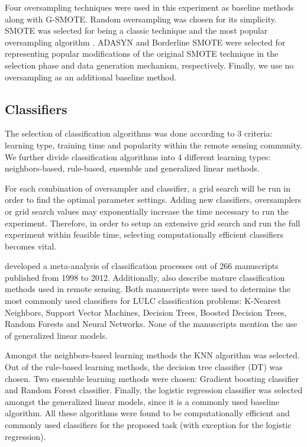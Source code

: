 \documentclass[remotesensing,article,submit,moreauthors,pdftex]{Definitions/mdpi}
\begin{document}
Four oversampling techniques were used in this experiment as baseline methods
along with G-SMOTE. Random oversampling was chosen for its simplicity. SMOTE was
selected for being a classic technique and the most popular oversampling
algorithm \cite{Douzas2019}. ADASYN \cite{HaiboHe2008} and Borderline SMOTE
\cite{Han2005} were selected for representing popular modifications of the
original SMOTE technique in the selection phase and data generation mechanism,
respectively. Finally, we use no oversampling as an additional baseline method.

\subsection{Classifiers}

The selection of classification algorithms was done according to 3 criteria:
learning type, training time and popularity within the remote sensing community.
We further divide classification algorithms into 4 different learning types:
neighbors-based, rule-based, ensemble and generalized linear methods.

For each combination of oversampler and classifier, a grid search will be run in
order to find the optimal parameter settings. Adding new classifiers,
oversamplers or grid search values may exponentially increase the time necessary
to run the experiment. Therefore, in order to setup an extensive grid search and
run the full experiment within feasible time, selecting computationally
efficient classifiers becomes vital.

\cite{Khatami2016} developed a meta-analysis of classification processes out of
266 manuscripts published from 1998 to 2012. Additionally, \cite{Maxwell2018}
also describe mature classification methods used in remote sensing. Both
manuscripts were used to determine the most commonly used classifiers for LULC
classification problems: K-Nearest Neighbors, Support Vector Machines, Decision
Trees, Boosted Decision Trees, Random Forests and Neural Networks. None of the
manuscripts mention the use of generalized linear models.

Amongst the neighbors-based learning methods the KNN algorithm was selected. Out
of the rule-based learning methods, the decision tree classifier (DT) was
chosen. Two ensemble learning methods were chosen: Gradient boosting classifier
and Random Forest classifier. Finally, the logistic regression classifier was
selected amongst the generalized linear models, since it is a commonly used
baseline algorithm. All these algorithms were found to be computationally
efficient and commonly used classifiers for the proposed task (with exception
for the logistic regression).
\end{document}
